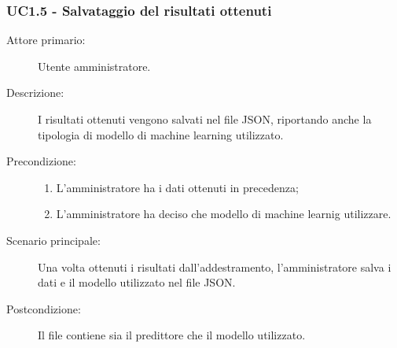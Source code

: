 \subsubsection{UC1.5 - Salvataggio del risultati ottenuti}
\label{sssec:uc1.5}
\begin{description}
  \item[Attore primario:] Utente amministratore.
  \item[Descrizione:] I risultati ottenuti vengono salvati nel file JSON, riportando anche la tipologia di modello di machine learning utilizzato.
  \item[Precondizione:]
  \begin{enumerate}
    \item L'amministratore ha i dati ottenuti in precedenza;
    \item L'amministratore ha deciso che modello di machine learnig  utilizzare.
  \end{enumerate}
  \item[Scenario principale:] Una volta ottenuti i risultati dall'addestramento, l'amministratore salva i dati e il modello utilizzato nel file JSON.
  \item[Postcondizione:] Il file contiene sia il predittore che il modello utilizzato.
\end{description}
